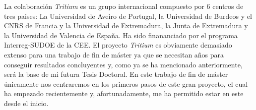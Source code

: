 La colaboración \textit{Tritium} es un grupo internacional compuesto por 6 centros de tres paises:  La Universidad de Aveiro de Portugal,  la Universidad de Burdeos y el CNRS de Francia y la Universidad de Extremadura, la Junta de Extremadura y la Universidad de Valencia de España. Ha sido finananciado por el programa Interreg-SUDOE de la CEE.  El proyecto \textit{Tritium} es  obviamente demasiado extenso para una trabajo de fin de máster ya que se necesitan años para conseguir resultados concluyentes y, como ya se ha mencionado anteriormente, será la base de mi futura Tesis Doctoral. En este trabajo de fin de máster únicamente nos centraremos en los primeros pasos de este gran proyecto, el cual ha empezado recientemente y, afortunadamente, me ha permitido estar en este desde el inicio.



